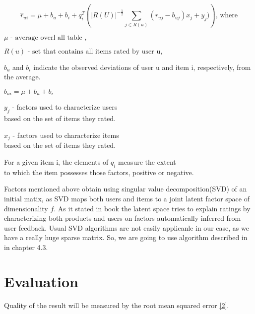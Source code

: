 \documentclass[a4paper,11pt]{article}
\begin{document}
\begin{equation} \label{1} \hat{r}_{u i} = \mu + b_u + b_i + q^T _i \left( | R(U) |^{ - \frac{1}{2}} \sum_{j \in R(u) } (r_{u j} - b_{u j}) x_j + y_j ) \right) \text{, where} \end{equation}
\begin{center} $  \mu \text{ - average overl all table  ,}  $ \end{center}
\begin{center} $   R(u) \text{ - set that contains all items rated by user u,} $ \end{center}
\begin{center} $ b_u $ and $ b_i $ indicate the observed deviations of user u and item i, respectively, from the average.
 \end{center}
\begin{center} $  b_{u i} = \mu + b_u + b_i $ \end{center}
\begin{center} $  y_j $  - factors used to characterize users \\ based on the set of items they rated.   \end{center}
\begin{center} $  x_j $ - factors used to characterize items \\ based on the set of items they rated.  \end{center}
\begin{center} For a given item i, the elements of $ q_i $ measure the extent \\ to which the item possesses those factors, positive or negative. \end{center}

Factors mentioned above obtain using singular value decomposition(SVD) of an initial matix, as SVD maps both users and items to a joint latent factor space of dimensionality $ f $. As it stated in book \cite{1} the latent space tries to explain ratings by characterizing both products and users on factors automatically inferred from user feedback. Usual SVD algorithms are not easily applicanle in our case, as we have a really huge sparse matrix. So, we are going to use algorithm described in \cite{2} in chapter 4.3. 

\section{Evaluation}

Quality of the result will be measured by the root mean squared error \ref{2}.
 
\end{document}
